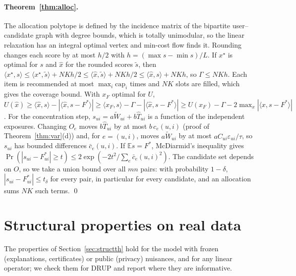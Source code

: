 \documentclass[preprint,review,12pt,authoryear]{elsarticle}
\theoremstyle{definition}
\newcommand{\E}{\mathbb{E}}
\newcommand{\tW}{\tilde W}
\begin{document}
\paragraph{Theorem~\ref{thm:alloc}.}
The allocation polytope is defined by the incidence matrix of the bipartite
user--candidate graph with degree bounds, which is totally unimodular, so the
linear relaxation has an integral optimal vertex and min-cost flow finds it.
Rounding changes each score by at most $h/2$ with $h=(\max s-\min s)/L$. If
$x^\star$ is optimal for $s$ and $\hat x$ for the rounded scores $\tilde s$, then
$\langle x^\star,s\rangle\le\langle x^\star,\tilde s\rangle+NKh/2\le\langle\hat x,\tilde s\rangle+NKh/2\le\langle\hat x,s\rangle+NKh$, so
$\Gamma\le NKh$. Each item is recommended at most $\max_i\mathrm{cap}_i$ times and $NK$
slots are filled, which gives the coverage bound. With $x_F$ optimal for $U$,
$U(\hat x)\ge\langle\hat x,s\rangle-|\langle\hat x,s-F^*\rangle|\ge\langle x_F,s\rangle-\Gamma-|\langle\hat x,s-F^*\rangle|
\ge U(x_F)-\Gamma-2\max_x|\langle x,s-F^*\rangle|$. For the concentration step,
$s_{ui}=a\tW_{ui}+b\hat T_{ui}$ is a function of the independent exposures.
Changing $O_e$ moves $b\hat T_{ui}$ by at most $b\,c_e(u,i)$ (proof of
Theorem~\ref{thm:var}(d)) and, for $e=(u,i)$, moves $a\tW_{ui}$ by at most
$aC_{ui}\varepsilon_{ui}/\tau$, so $s_{ui}$ has bounded differences $\bar c_e(u,i)$. If
$\E s=F^*$, McDiarmid's inequality gives
$\Pr(|s_{ui}-F^*_{ui}|\ge t)\le2\exp(-2t^2/\sum_e\bar c_e(u,i)^2)$. The candidate set
depends on $O$, so we take a union bound over all $mn$ pairs: with probability
$1-\delta$, $|s_{ui}-F^*_{ui}|\le t_\delta$ for every pair, in particular for every
candidate, and an allocation sums $NK$ such terms. \qed

\section{Structural properties on real data}\label{sec:struct}

The properties of Section~\ref{sec:structth} hold for the model with frozen
(explanations, certificates) or public (privacy) nuisances, and for any linear
operator; we check them for DRUP and report where they are informative.

\begin{table}[t]\centering\small
\caption{Exact explanations (Proposition~\ref{prop:affine}, Theorem~\ref{thm:cf}) on 200 random
test users: largest relative error of completeness and subset additivity
against re-propagation; rank of the top-1 item after un-logging the five
interactions with the largest attribution, five random ones, or the five most
similar ones (0 = still first); share of top-1 recommendations for which no
subset of the user's own interactions makes the second item overtake it; median
size of the minimal counterfactual explanation otherwise. Every explanation
was verified by re-scoring.}\label{tab:explain}
\begin{adjustbox}{max width=\textwidth}

\end{adjustbox}
\end{table}
\end{document}
